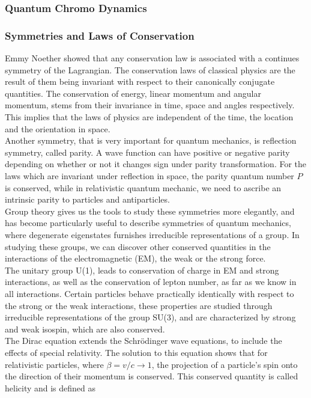 \documentclass[11pt,a4paper]{article}
\begin{document}
\subsubsection{Quantum Chromo Dynamics}

\subsubsection{Symmetries and Laws of Conservation} Emmy Noether showed that any
conservation law is associated with a continues symmetry of the Lagrangian. The
conservation laws of classical physics are the result of them being invariant
with respect to their canonically conjugate quantities. The conservation of
energy, linear momentum and angular momentum, stems from their invariance in
time, space and angles respectively. This implies that the laws of physics are
independent of the time, the location and the orientation in space.\\

Another symmetry, that is very important for quantum mechanics, is reflection
symmetry, called parity. A wave function can have positive or negative parity
depending on whether or not it changes sign under parity transformation. For the
laws which are invariant under reflection in space, the parity quantum number
$P$ is conserved, while in relativistic quantum mechanic, we need to ascribe an
intrinsic parity to particles and antiparticles.\\

Group theory gives us the tools to study these symmetries more elegantly, and
has become particularly useful to describe symmetries of quantum mechanics,
where degenerate eigenstates furnishes irreducible representations of a group.
In studying these groups, we can discover other conserved quantities in the
interactions of the electromagnetic (EM), the weak or the strong force.\\

The unitary group U(1), leads to conservation of charge in EM and strong
interactions, as well as the conservation of lepton number, as far as
we know in all interactions. Certain particles behave practically identically
with respect to the strong or the weak interactions, these properties are
studied through irreducible representations of the group SU(3), and are
characterized by strong and weak isospin, which are also conserved.\\

The Dirac equation extends the Schrödinger wave equations, to include the effects of special relativity. The solution to this equation shows that for relativistic particles, where $\beta = v/c \rightarrow 1$, the projection of a particle's spin onto the direction of their momentum is conserved. This conserved quantity is called helicity and is defined as
\end{document}
